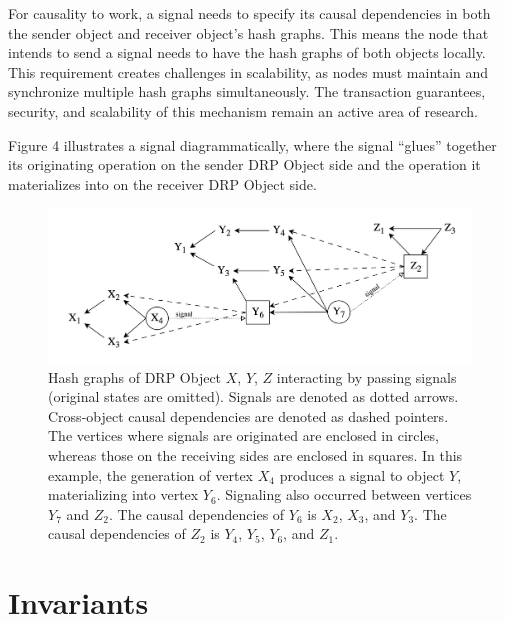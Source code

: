 \documentclass{article}
\begin{document}
For causality to work, a signal needs to specify its causal dependencies in both the sender object and receiver object's hash graphs. This means the node that intends to send a signal needs to have the hash graphs of both objects locally. This requirement creates challenges in scalability, as nodes must maintain and synchronize multiple hash graphs simultaneously. The transaction guarantees, security, and scalability of this mechanism remain an active area of research.

Figure 4 illustrates a signal diagrammatically, where the signal “glues” together its originating operation on the sender DRP Object side and the operation it materializes into on the receiver DRP Object side.

\begin{figure}[htp]
    \centering
    \includegraphics[width=15cm]{fig4}
    \caption{Hash graphs of DRP Object $X$, $Y$, $Z$ interacting by passing signals (original states are omitted). Signals are denoted as dotted arrows. Cross-object causal dependencies are denoted as dashed pointers. The vertices where signals are originated are enclosed in circles, whereas those on the receiving sides are enclosed in squares. In this example, the generation of vertex $X_4$ produces a signal to object $Y$, materializing into vertex $Y_6$. Signaling also occurred between vertices $Y_7$ and $Z_2$. The causal dependencies of $Y_6$ is $X_2$, $X_3$, and $Y_3$. The causal dependencies of $Z_2$ is $Y_4$, $Y_5$, $Y_6$, and $Z_1$.}
    \label{fig:4}
\end{figure}

\section{Invariants}
\label{sec:headings}
\end{document}
